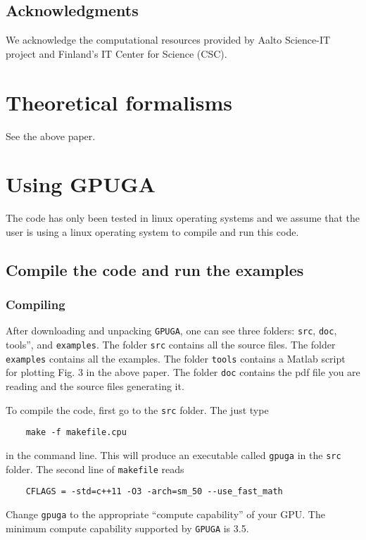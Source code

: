 \documentclass[12pt,a4paper]{report}
\begin{document}
\section{Acknowledgments}
We acknowledge the computational resources provided by Aalto Science-IT project and Finland's IT Center for Science (CSC).

\chapter{Theoretical formalisms\label{section:theory}}

See the above paper. 

\chapter{Using GPUGA \label{section:usage}}

The code has only been tested in linux operating systems and we assume that the user is using a linux operating system to compile and run this code.

\section{Compile the code and run the examples}

\subsection{Compiling}

After downloading and unpacking \verb"GPUGA", one can see three folders:  \verb"src",  \verb"doc",  \verb''tools'', and \verb"examples". The folder \verb"src" contains all the source files. The folder \verb"examples" contains all the examples. The folder \verb"tools" contains a Matlab script for plotting Fig. 3 in the above paper. The folder \verb"doc" contains the pdf file you are reading and the source files generating it.

To compile the code, first go to the \verb"src" folder. The just type
\begin{verbatim}
    make -f makefile.cpu
\end{verbatim}
in the command line. This will produce an executable called \verb"gpuga" in the \verb"src" folder. The second line of \verb"makefile" reads
\begin{verbatim}
    CFLAGS = -std=c++11 -O3 -arch=sm_50 --use_fast_math
\end{verbatim}
Change \verb"gpuga" to the appropriate ``compute capability'' of your GPU. The minimum compute capability supported by \verb"GPUGA" is 3.5.
\end{document}
